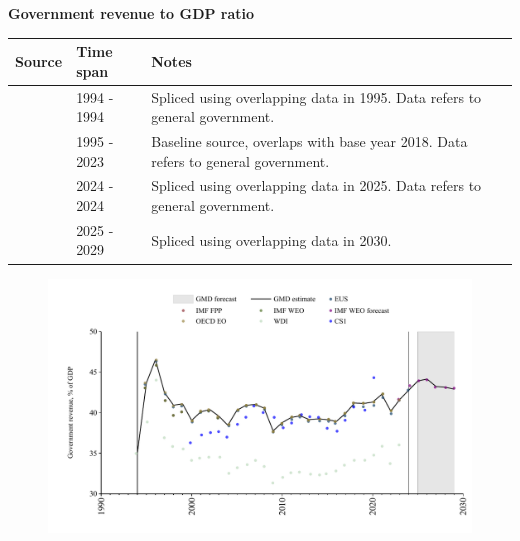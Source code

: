 \documentclass[12pt,a4paper,landscape]{article}
\begin{document}
\begin{adjustbox}{max totalsize={\paperwidth}{\paperheight},center}
\begin{minipage}[t][\textheight][t]{\textwidth}
\vspace*{0.5cm}
{}
\begin{center}
{\Large\bfseries Government revenue to GDP ratio}
\end{center}
\vspace{0.5cm}
\begin{table}[H]
\centering
\small
\begin{tabular}{|l|l|l|}
\hline
\textbf{Source} & \textbf{Time span} & \textbf{Notes} \\
\hline
\rowcolor{white}\cite{WDI}& 1994 - 1994 &Spliced using overlapping data in 1995. Data refers to general government.\\
\rowcolor{lightgray}\cite{OECD_EO}& 1995 - 2023 &Baseline source, overlaps with base year 2018. Data refers to general government.\\
\rowcolor{white}\cite{EUS}& 2024 - 2024 &Spliced using overlapping data in 2025. Data refers to general government.\\
\rowcolor{lightgray}\cite{IMF_WEO_forecast}& 2025 - 2029 &Spliced using overlapping data in 2030. \\
\hline
\end{tabular}
\end{table}
\begin{figure}[H]
\centering
\includegraphics[width=\textwidth,height=0.6\textheight,keepaspectratio]{graphs/POL_govrev_GDP.pdf}
\end{figure}
\end{minipage}
\end{adjustbox}
\end{document}
